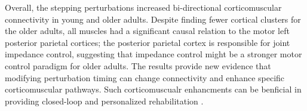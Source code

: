 \documentclass[../thesis_seyed.tex]{subfiles}
\begin{document}
Overall, the stepping perturbations increased bi-directional corticomuscular connectivity in  young and older adults. Despite finding fewer cortical clusters for the older adults, all muscles had a significant causal relation to the motor left posterior parietal cortices; the posterior parietal cortex is responsible for joint impedance control, suggesting that impedance control might be a stronger motor control paradigm for older adults. The results provide new evidence that modifying perturbation timing can change connectivity and enhance specific corticomuscular pathways. Such corticomuscualr enhancments can be benficial in providing closed-loop and personalized rehabilitation \cite{Reinkensmeyer2016-ip}.



\end{document}
